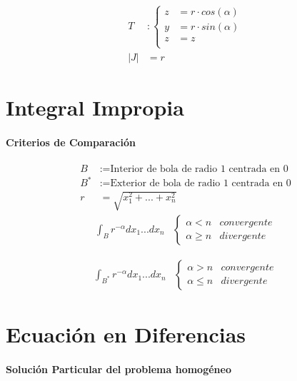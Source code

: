 \documentclass{article}
\begin{document}
\begin{multicols}{2}
        \begin{align*}
          T &:
          \begin{cases}
            z &= r \cdot cos(\alpha)\\
            y &= r \cdot sin(\alpha)\\
            z &= z \\
          \end{cases} \\
          \left|J\right| &= r
        \end{align*}

    \section{Integral Impropia}

      \paragraph{Criterios de Comparación}
        \begin{align*}
          B &:= \text{Interior de bola de radio 1 centrada en 0} \\
          B^* &:= \text{Exterior de bola de radio 1 centrada en 0} \\
          r &= \sqrt{x_1^2 + ... + x_n^2}
        \end{align*}
        \begin{align*}
          \int_B r^{-\alpha} dx_1...dx_n &
          \begin{cases}
            \alpha < n & convergente\\
            \alpha \geq n & divergente
          \end{cases}
        \end{align*}

        \begin{align*}
          \int_{B^*}r^{-\alpha} dx_1...dx_n &
          \begin{cases}
            \alpha > n & convergente\\
            \alpha \leq n & divergente
          \end{cases}
        \end{align*}
    \section{Ecuación en Diferencias}

      \paragraph{Solución Particular del problema homogéneo}


\end{multicols}
\end{document}
